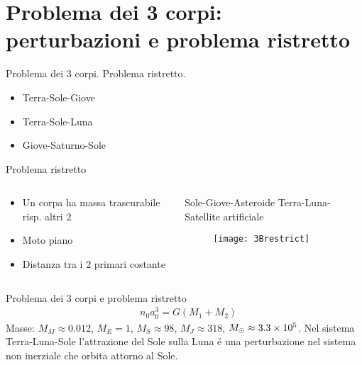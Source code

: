 \section{Problema dei 3 corpi: perturbazioni e problema ristretto}

\begin{frame}{Problema dei 3 corpi. Problema ristretto.}
\begin{itemize}
\item Terra-Sole-Giove
\item Terra-Sole-Luna
\item Giove-Saturno-Sole
\end{itemize}
\begin{block}{Problema ristretto}
\begin{columns}
\begin{column}{0.5\textwidth}
\begin{itemize}
\item Un corpa ha massa trascurabile risp. altri 2
\item Moto piano
\item Distanza tra i 2 primari costante
\end{itemize}
\end{column}
\begin{column}{0.5\textwidth}
Sole-Giove-Asteroide
Terra-Luna-Satellite artificiale
\begin{figure}
\texttt{[image: 3Brestrict]}
\end{figure}
\end{column}
\end{columns}
\end{block}
\end{frame}

\begin{wordonframe}{Problema dei 3 corpi e problema ristretto}
\begin{align*}
&n_0a_0^3=G(M_1+M_2)
\end{align*}
Masse: $M_M\approx0.012$, $M_E=1$, $M_S\approx98$, $M_J\approx318$, $M_{\odot}{}\approx\num{3.3e5}$.
Nel sistema Terra-Luna-Sole l'attrazione del Sole sulla Luna \'e una perturbazione nel sistema non inerziale che orbita attorno al Sole. 
\end{wordonframe}

